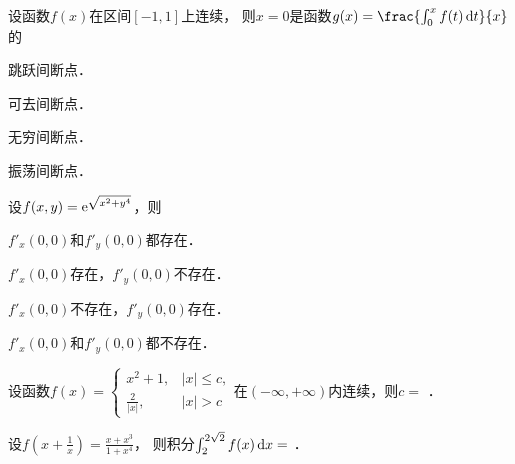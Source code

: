 \documentclass[plain,noanswer,medmath]{../../template/jnuexam}
\begin{document}






\begin{problem}
设函数$f(x)$在区间$[-1,1]$上连续，
则$x = 0$是函数$g(x) = \frac{\int_0^x f(t)\dt}{x}$的\pickout{}
\begin{abcd}
\item 跳跃间断点．
\item 可去间断点．
\item 无穷间断点．
\item 振荡间断点．
\end{abcd}
\end{problem}




\begin{problem}
设$f(x,y) = \mathrm{e}^{\sqrt{x^2 + y^4}}$，则\pickout{}
\begin{abcd}
\item $f'_x(0,0)$和$f'_y(0,0)$都存在．
\item $f'_x(0,0)$存在，$f'_y(0,0)$不存在．
\item $f'_x(0,0)$不存在，$f'_y(0,0)$存在．
\item $f'_x(0,0)$和$f'_y(0,0)$都不存在．
\end{abcd}
\end{problem}














\begin{problem}
设函数$f(x) = \begin{cases}
        x^2 + 1, & |x| \le c, \\
  \frac{2}{|x|}, & |x| > c
\end{cases}$在$(-\infty , +\infty)$内连续，则$c =$ \fillin{}．
\end{problem}


\begin{problem}
设$f\left(x + \frac{1}{x} \right) = \frac{x + x^3}{1 + x^4}$，
则积分$\int_2^{2\sqrt{2}} f (x)\mathop{}\!\mathrm{d} x =$ \fillin{}．
\end{problem}
\end{document}
